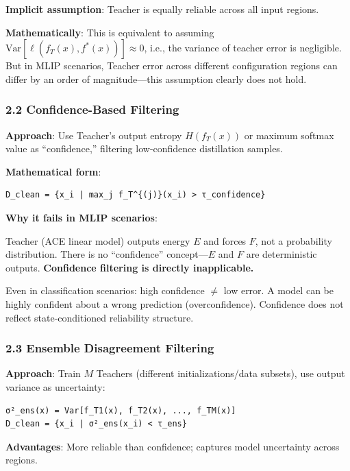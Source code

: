 \documentclass[
  12pt,
]{article}
\begin{document}
\textbf{Implicit assumption}: Teacher is equally reliable across all input regions.

\textbf{Mathematically}: This is equivalent to assuming $\text{Var}[\ell(f_T(x), f^*(x))] \approx 0$, i.e., the variance of teacher error is negligible. But in MLIP scenarios, Teacher error across different configuration regions can differ by an order of magnitude---this assumption clearly does not hold.

\subsubsection{2.2 Confidence-Based Filtering}\label{confidence-based-filtering}

\textbf{Approach}: Use Teacher's output entropy $H(f_T(x))$ or maximum softmax value as ``confidence,'' filtering low-confidence distillation samples.

\textbf{Mathematical form}:

\begin{verbatim}
D_clean = {x_i | max_j f_T^{(j)}(x_i) > τ_confidence}
\end{verbatim}

\textbf{Why it fails in MLIP scenarios}:

Teacher (ACE linear model) outputs energy $E$ and forces $F$, not a probability distribution. There is no ``confidence'' concept---$E$ and $F$ are deterministic outputs. \textbf{Confidence filtering is directly inapplicable.}

Even in classification scenarios: high confidence $\neq$ low error. A model can be highly confident about a wrong prediction (overconfidence). Confidence does not reflect state-conditioned reliability structure.

\subsubsection{2.3 Ensemble Disagreement Filtering}\label{ensemble-disagreement-filtering}

\textbf{Approach}: Train $M$ Teachers (different initializations/data subsets), use output variance as uncertainty:

\begin{verbatim}
σ²_ens(x) = Var[f_T1(x), f_T2(x), ..., f_TM(x)]
D_clean = {x_i | σ²_ens(x_i) < τ_ens}
\end{verbatim}

\textbf{Advantages}: More reliable than confidence; captures model uncertainty across regions.
\end{document}
